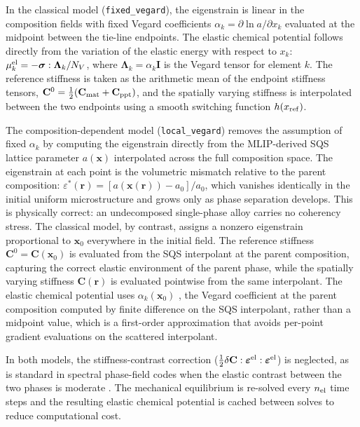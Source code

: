 {In the classical model (\texttt{fixed\_vegard}), the eigenstrain is linear
in the composition fields with fixed Vegard coefficients
$\alpha_k = \partial\ln a/\partial x_k$ evaluated at the midpoint between
the tie-line endpoints.  The elastic chemical potential follows directly
from the variation of the elastic energy with respect to $x_k$:
$\mu_k^{\rm el} = -\boldsymbol{\sigma}:\boldsymbol{\Lambda}_k/N_V$,
where $\boldsymbol{\Lambda}_k = \alpha_k\mathbf{I}$ is the Vegard tensor
for element $k$.  The reference stiffness is taken as the arithmetic mean
of the endpoint stiffness tensors, $\mathbf{C}^0 = \tfrac{1}{2}(\mathbf{C}_{\rm mat}+\mathbf{C}_{\rm ppt})$,
and the spatially varying stiffness is interpolated between the two
endpoints using a smooth switching function $h(x_{\rm ref})$.

The composition-dependent model (\texttt{local\_vegard}) removes the
assumption of fixed $\alpha_k$ by computing the eigenstrain directly from
the MLIP-derived SQS lattice parameter $a(\boldsymbol{x})$ interpolated
across the full composition space.  The eigenstrain at each point is the
volumetric mismatch relative to the parent composition:
$\varepsilon^*(\boldsymbol{r}) = [a(\boldsymbol{x}(\boldsymbol{r})) - a_0]/a_0$,
which vanishes identically in the initial uniform microstructure and grows
only as phase separation develops.  This is physically correct: an
undecomposed single-phase alloy carries no coherency stress.  The classical
model, by contrast, assigns a nonzero eigenstrain proportional to
$\boldsymbol{x}_0$ everywhere in the initial field.  The reference
stiffness $\mathbf{C}^0 = \mathbf{C}(\boldsymbol{x}_0)$ is evaluated from
the SQS interpolant at the parent composition, capturing the correct elastic
environment of the parent phase, while the spatially varying stiffness
$\mathbf{C}(\boldsymbol{r})$ is evaluated pointwise from the same
interpolant.  The elastic chemical potential uses $\alpha_k(\boldsymbol{x}_0)$
, the Vegard coefficient at the parent composition computed by finite difference on the SQS interpolant, rather than a midpoint value,
which is a first-order approximation that avoids per-point gradient
evaluations on the scattered interpolant.

In both models, the stiffness-contrast correction
($\tfrac{1}{2}\delta\mathbf{C}:\boldsymbol{\varepsilon}^{\rm el}:\boldsymbol{\varepsilon}^{\rm el}$)
is neglected, as is standard in spectral phase-field codes when the
elastic contrast between the two phases is moderate \cite{gururajan2007phase}.
The mechanical equilibrium is re-solved every $n_{\rm el}$ time steps
and the resulting elastic chemical potential is cached between solves to
reduce computational cost.
}


